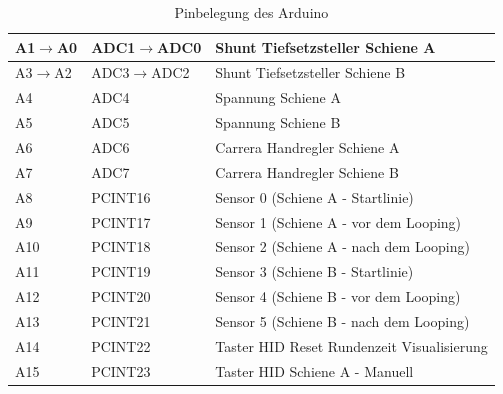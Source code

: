 \documentclass[a4paper, 11pt]{report}
\begin{document}
\begin{table}[hb]
\begin{tabular}{|l|l|l|}
			A1$\rightarrow$A0 & ADC1$\rightarrow$ADC0 & Shunt Tiefsetzsteller Schiene A\\
			\hline
			A3$\rightarrow$A2 & ADC3$\rightarrow$ADC2 & Shunt Tiefsetzsteller Schiene B\\
			\hline
			A4 & ADC4 & Spannung Schiene A\\
			\hline
			A5 & ADC5 & Spannung Schiene B\\
			\hline
			A6 & ADC6 & Carrera Handregler Schiene A\\
			\hline
			A7 & ADC7 & Carrera Handregler Schiene B\\
			\hline
			A8 & PCINT16 & Sensor 0 (Schiene A - Startlinie)\\
			\hline
			A9 & PCINT17 & Sensor 1 (Schiene A - vor dem Looping)\\
			\hline
			A10 & PCINT18 & Sensor 2 (Schiene A - nach dem Looping)\\
			\hline
			A11 & PCINT19 & Sensor 3 (Schiene B - Startlinie)\\
			\hline
			A12 & PCINT20 & Sensor 4 (Schiene B - vor dem Looping)\\
			\hline
			A13 & PCINT21 & Sensor 5 (Schiene B - nach dem Looping)\\
			\hline
			A14 & PCINT22 & Taster HID \glqq Reset Rundenzeit Visualisierung\grqq \\
			\hline
			A15 & PCINT23 & Taster HID \glqq Schiene A - Manuell\grqq \\
			\hline
		\end{tabular}
		\caption{Pinbelegung des Arduino}
		\label{tab:AnhangBelegungArduino}
	\end{table}
\end{document}
